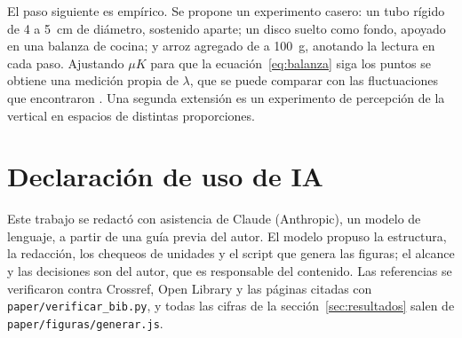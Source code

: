 \documentclass[11pt,a4paper]{article}
\begin{document}
El paso siguiente es empírico. Se propone un experimento casero: un tubo rígido de 4 a 5~cm de diámetro, sostenido aparte; un disco suelto como fondo, apoyado en una balanza de cocina; y arroz agregado de a 100~g, anotando la lectura en cada paso. Ajustando $\mu K$ para que la ecuación~\eqref{eq:balanza} siga los puntos se obtiene una medición propia de $\lambda$, que se puede comparar con las fluctuaciones que encontraron \textcite{vanel1999}. Una segunda extensión es un experimento de percepción de la vertical en espacios de distintas proporciones.

\section*{Declaración de uso de IA}

Este trabajo se redactó con asistencia de Claude (Anthropic), un modelo de lenguaje, a partir de una guía previa del autor. El modelo propuso la estructura, la redacción, los chequeos de unidades y el script que genera las figuras; el alcance y las decisiones son del autor, que es responsable del contenido. Las referencias se verificaron contra Crossref, Open Library y las páginas citadas con \texttt{paper/verificar\_bib.py}, y todas las cifras de la sección~\ref{sec:resultados} salen de \texttt{paper/figuras/generar.js}.

\printbibliography
\end{document}
